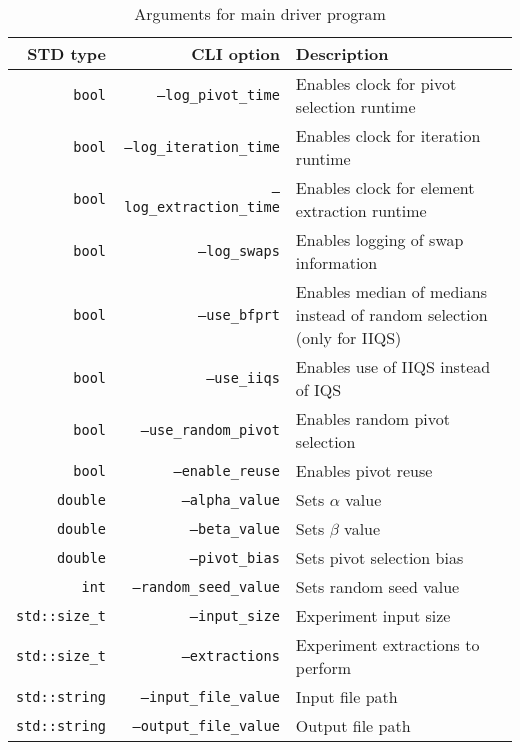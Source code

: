 \begin{table}[!ht]
    \centering
    \caption{Arguments for main driver program}
    \begin{tabularx}{\linewidth}{|r|r|X|}
        \hline
        STD type & CLI option & Description \\
        \hline
        \texttt{bool} & \texttt{--log\_pivot\_time} & Enables clock for pivot selection runtime\\
        \hline
        \texttt{bool} & \texttt{--log\_iteration\_time} & Enables clock for iteration runtime \\
        \hline
        \texttt{bool} & \texttt{--log\_extraction\_time} & Enables clock for element extraction runtime\\
        \hline
        \texttt{bool} & \texttt{--log\_swaps} & Enables logging of swap information \\
        \hline
        \texttt{bool} & \texttt{--use\_bfprt} & Enables median of medians instead of random selection (only for IIQS) \\
        \hline
        \texttt{bool} & \texttt{--use\_iiqs} & Enables use of IIQS instead of IQS \\
        \hline
        \texttt{bool} & \texttt{--use\_random\_pivot} & Enables random pivot selection \\
        \hline
        \texttt{bool} & \texttt{--enable\_reuse} & Enables pivot reuse \\
        \hline
        \texttt{double} & \texttt{--alpha\_value} & Sets $\alpha$ value \\
        \hline
        \texttt{double} & \texttt{--beta\_value} & Sets $\beta$ value \\
        \hline
        \texttt{double} & \texttt{--pivot\_bias} & Sets pivot selection bias \\
        \hline
        \texttt{int} & \texttt{--random\_seed\_value} & Sets random seed value \\
        \hline
        \texttt{std::size\_t} & \texttt{--input\_size} & Experiment input size \\
        \hline
        \texttt{std::size\_t} & \texttt{--extractions} & Experiment extractions to perform \\
        \hline
        \texttt{std::string} & \texttt{--input\_file\_value} & Input file path \\
        \hline
        \texttt{std::string} & \texttt{--output\_file\_value} & Output file path \\
        \hline    
    \end{tabularx}
    \label{TABLE:ARGUMENTS}
\end{table}

